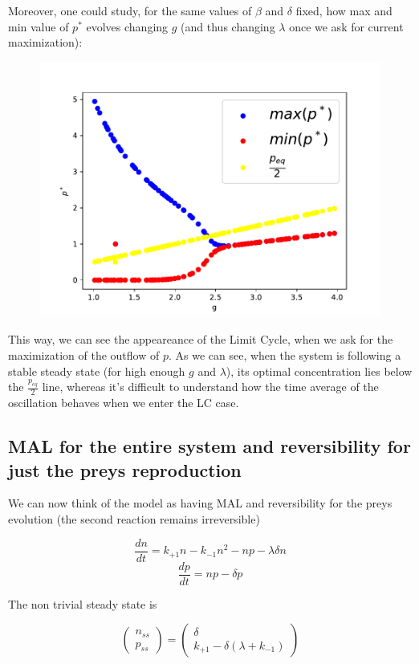 \documentclass{article}
\begin{document}
	Moreover, one could study, for the same values of $\beta$ and $\delta$ fixed, how max and min value of $p^*$ evolves changing $g$ (and thus changing $\lambda$ once we ask for current maximization):
	\begin{figure}[h!]
		\begin{center}
			\includegraphics[width=0.7\linewidth]{LC.pdf}
		\end{center}
	\end{figure}
	
	\hfill \break
	This way, we can see the appeareance of the Limit Cycle, when we ask for the maximization of the outflow of $p$. As we can see, when the system is following a stable steady state (for high enough $g$ and $\lambda$), its optimal concentration lies below the $\frac{p_{eq}}{2}$ line, whereas it's difficult to understand how the time average of the oscillation behaves when we enter the LC case.
	
	\subsection{MAL for the entire system and reversibility for just the preys reproduction}
	We can now think of the model as having MAL and reversibility for the preys evolution (the second reaction remains irreversible)
	
	\begin{equation}
		\frac{dn}{dt}=k_{+1} n -k_{-1}n^2  -n p-\lambda \delta n
	\end{equation}
	\begin{equation}
		\frac{dp}{dt}=n p-\delta p
	\end{equation}
	
	The non trivial steady state is 
	
	$$\begin{pmatrix}
		n_{ss} \\ p_{ss}
	\end{pmatrix}=\begin{pmatrix}
		\delta \\ k_{+1}-\delta (\lambda + k_{-1})
	\end{pmatrix} $$
	
\end{document}
